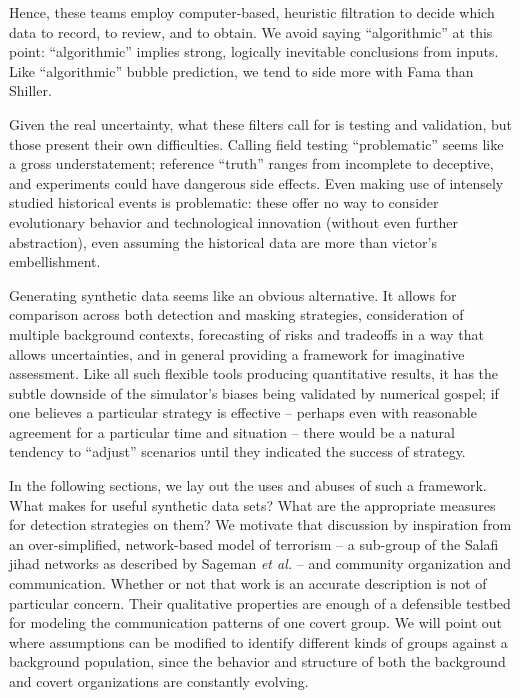 \documentclass{article}
\begin{document}
Hence, these teams employ computer-based, heuristic filtration to decide which data to record, to review, and to obtain.  We avoid saying ``algorithmic'' at this point: ``algorithmic'' implies strong, logically inevitable conclusions from inputs.  Like ``algorithmic'' bubble prediction, we tend to side more with Fama than Shiller.

Given the real uncertainty, what these filters call for is testing and validation, but those present their own difficulties.  Calling field testing ``problematic'' seems like a gross understatement; reference ``truth'' ranges from incomplete to deceptive, and experiments could have dangerous side effects.  Even making use of intensely studied historical events is problematic: these offer no way to consider evolutionary behavior and technological innovation (without even further abstraction), even assuming the historical data are more than victor's embellishment.

Generating synthetic data seems like an obvious alternative.  It allows for comparison across both detection and masking strategies, consideration of multiple background contexts, forecasting of risks and tradeoffs in a way that allows uncertainties, and in general providing a framework for imaginative assessment.  Like all such flexible tools producing quantitative results, it has the subtle downside of the simulator's biases being validated by numerical gospel; if one believes a particular strategy is effective -- perhaps even with reasonable agreement for a particular time and situation -- there would be a natural tendency to ``adjust'' scenarios until they indicated the success of strategy.

In the following sections, we lay out the uses and abuses of such a framework.  What makes for useful synthetic data sets?  What are the appropriate measures for detection strategies on them?  We motivate that discussion by inspiration from an over-simplified, network-based model of terrorism -- a sub-group of the Salafi jihad networks as described by Sageman {\em et al.}\cite{sageman} -- and community organization and communication.  Whether or not that work is an accurate description is not of particular concern.  Their qualitative properties are enough of a defensible testbed for modeling the communication patterns of one covert group.  We will point out where assumptions can be modified to identify different kinds of groups against a background population, since the behavior and structure of both the background and covert organizations are constantly evolving. 
\end{document}
